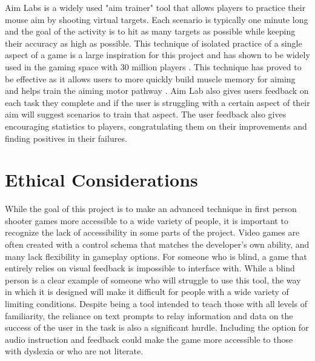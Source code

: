 \documentclass[10pt,twocolumn]{article}
\begin{document}
Aim Labs is a widely used "aim trainer" tool that allows players to practice their mouse aim by shooting virtual targets. Each scenario is typically one minute long and the goal of the activity is to hit as many targets as possible while keeping their accuracy as high as possible. This technique of isolated practice of a single aspect of a game is a large inspiration for this project and has shown to be widely used in the gaming space with 30 million players \cite{STEAMDBAimLabChart}. This technique has proved to be effective as it allows users to more quickly build muscle memory for aiming and helps train the aiming motor pathway \cite{aimTrainingWorks}. Aim Lab also gives users feedback on each task they complete and if the user is struggling with a certain aspect of their aim will suggest scenarios to train that aspect. The user feedback also gives encouraging statistics to players, congratulating them on their improvements and finding positives in their failures.


\section{Ethical Considerations}

While the goal of this project is to make an advanced technique in first person shooter games more accessible to a wide variety of people, it is important to recognize the lack of accessibility in some parts of the project. Video games are often created with a control schema that matches the developer's own ability, and many lack flexibility in gameplay options. For someone who is blind, a game that entirely relies on visual feedback is impossible to interface with. While a blind person is a clear example of someone who will struggle to use this tool, the way in which it is designed will make it difficult for people with a wide variety of limiting conditions. Despite being a tool intended to teach those with all levels of familiarity, the reliance on text prompts to relay information and data on the success of the user in the task is also a significant hurdle\cite{AccessInVidya}. Including the option for audio instruction and feedback could make the game more accessible to those with dyslexia or who are not literate. 
\end{document}
